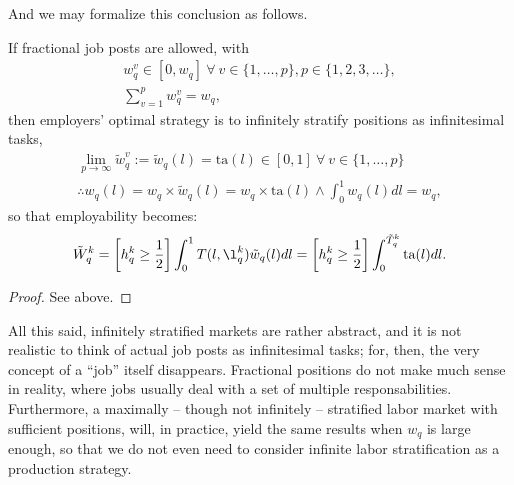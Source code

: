 \documentclass[hidelinks, nonatbib]{elsarticle}
\begin{document}
And we may formalize this conclusion as follows.
\begin{lemma}
    \label{isl}
    If fractional job posts are allowed, with
    \begin{gather}
        w_{q}^{v} 
        \in 
        [0, w_q]
        \
        \forall
        \
        v \in \{1, \dots, p\}
        ,
        p \in \{1, 2, 3, \dots\}
        ,
        \\
        \sum_{v=1}^{p}
        w_{q}^{v}
        =
        w_q
        ,
        \end{gather}
        then employers' optimal strategy is to infinitely stratify positions as infinitesimal tasks,
        \begin{gather}
            \lim_{p \rightarrow \infty}{
                \tilde{w}_{q}^{v}
            }
            := 
            \tilde{w}_{q}(l)
            =
            \text{ta}(l)
            \in [0,1]
            \
            \forall
            \
            v \in \{1, \dots, p\}
            \\
            \therefore
            w_{q}(l)
            = 
            w_q \times \tilde{w}_{q}(l)
            =
            w_q \times \text{ta}(l)
            \land
            \int_{0}^{1}{
                w_{q}(l)
                dl
            }
            =
            w_q
            ,
            \end{gather}
            so that employability becomes:
            \begin{gather}
                \tilde{W}_{q}^{k} 
                = 
                \left[
                    h_{q}^{k}
                    \geq
                    \frac{1}{2}
                \right]
                \int_{0}^{1}
                T(l, \l_{q}^{k})
                \tilde{w}_{q}(l)
                dl
                = 
                \left[
                    h_{q}^{k}
                    \geq
                    \frac{1}{2}
                \right]
                \int_{0}^{\tilde{T}_{q}^{k}}
                \text{ta}(l)
                dl
                .
                \end{gather}
    \begin{proof}
        See above.
    \end{proof}
\end{lemma}

All this said, infinitely stratified markets are rather abstract, and it is not realistic to think of actual job posts as infinitesimal tasks; for, then, the very concept of a ``job'' itself disappears. Fractional positions do not make much sense in reality, where jobs usually deal with a set of multiple responsabilities. Furthermore, a maximally -- though not infinitely -- stratified labor market with sufficient positions, will, in practice, yield the same results when $w_q$ is large enough, so that we do not even need to consider infinite labor stratification as a production strategy.
\end{document}
